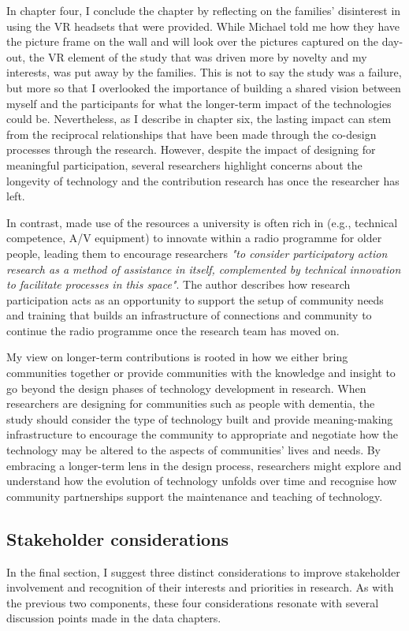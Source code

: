 In chapter four, I conclude the chapter by reflecting on the families' disinterest in using the VR headsets that were provided. While Michael told me how they have the picture frame on the wall and will look over the pictures captured on the day-out, the VR element of the study that was driven more by novelty and my interests, was put away by the families. This is not to say the study was a failure, but more so that I overlooked the importance of building a shared vision between myself and the participants for what the longer-term impact of the technologies could be. Nevertheless, as I describe in chapter six, the lasting impact can stem from the reciprocal relationships that have been made through the co-design processes through the research. However, despite the impact of designing for meaningful participation, several researchers highlight concerns about the longevity of technology and the contribution research has once the researcher has left. 

In contrast, \citep{reuter2021content} made use of the resources a university is often rich in (e.g., technical competence, A/V equipment) to innovate within a radio programme for older people, leading them to encourage researchers \textit{"to consider participatory action research as a method of assistance in itself, complemented by technical innovation to facilitate processes in this space"}. The author describes how research participation acts as an opportunity to support the setup of community needs and training that builds an infrastructure of connections and community to continue the radio programme once the research team has moved on.

My view on longer-term contributions is rooted in how we either bring communities together or provide communities with the knowledge and insight to go beyond the design phases of technology development in research. When researchers are designing for communities such as people with dementia, the study should consider the type of technology built and provide meaning-making infrastructure to encourage the community to appropriate and negotiate how the technology may be altered to the aspects of communities' lives and needs. By embracing a longer-term lens in the design process, researchers might explore and understand how the evolution of technology unfolds over time and recognise how community partnerships support the maintenance and teaching of technology.

\subsection{Stakeholder considerations}
\label{StakeholderConsideration}
In the final section, I suggest three distinct considerations to improve stakeholder involvement and recognition of their interests and priorities in research. As with the previous two components, these four considerations resonate with several discussion points made in the data chapters.

